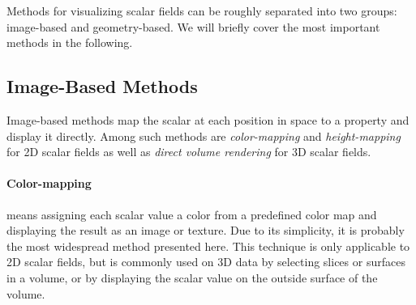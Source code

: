 %
%
Methods for visualizing scalar fields can be roughly separated into two groups:
image-based and geometry-based.
%
We will briefly cover the most important methods in the following.
%
%

\subsection{Image-Based Methods} %
\label{sub:image_based_methods}
%
Image-based methods map the scalar at each position in space to a property and
display it directly.
%
Among such methods are \emph{color-mapping} and \emph{height-mapping} for
\ac{2D} scalar fields as well as \emph{direct volume rendering} for \ac{3D}
scalar fields.
%

%
\paragraph{Color-mapping} means assigning each scalar value a color from a
predefined color map and displaying the result as an image or texture.
%
Due to its simplicity, it is probably the most widespread method presented here.
%
This technique is only applicable to \ac{2D} scalar fields, but is commonly used
on \ac{3D} data by selecting slices or surfaces in a volume, or by displaying
the scalar value on the outside surface of the volume.
%

